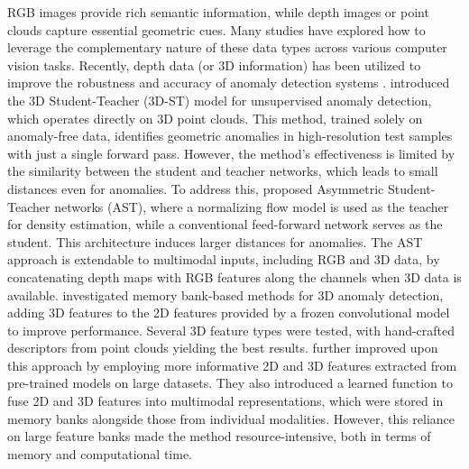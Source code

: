 RGB images provide rich semantic information, while depth images or point clouds capture essential geometric cues. Many studies have explored how to leverage the complementary nature of these data types across various computer vision tasks. Recently, depth data (or 3D information) has been utilized to improve the robustness and accuracy of anomaly detection systems \cite{horwitz2022empirical, wang2023multimodal}. \cite{bergmann2023anomaly} introduced the 3D Student-Teacher (3D-ST) model for unsupervised anomaly detection, which operates directly on 3D point clouds. This method, trained solely on anomaly-free data, identifies geometric anomalies in high-resolution test samples with just a single forward pass. However, the method's effectiveness is limited by the similarity between the student and teacher networks, which leads to small distances even for anomalies. To address this, \cite{rudolph2023asymmetric} proposed Asymmetric Student-Teacher networks (AST), where a normalizing flow model is used as the teacher for density estimation, while a conventional feed-forward network serves as the student. This architecture induces larger distances for anomalies. The AST approach is extendable to multimodal inputs, including RGB and 3D data, by concatenating depth maps with RGB features along the channels when 3D data is available. \cite{horwitz2023back} investigated memory bank-based methods for 3D anomaly detection, adding 3D features to the 2D features provided by a frozen convolutional model to improve performance. Several 3D feature types were tested, with hand-crafted descriptors from point clouds yielding the best results. \cite{wang2023multimodal} further improved upon this approach by employing more informative 2D and 3D features extracted from pre-trained models on large datasets. They also introduced a learned function to fuse 2D and 3D features into multimodal representations, which were stored in memory banks alongside those from individual modalities. However, this reliance on large feature banks made the method resource-intensive, both in terms of memory and computational time.